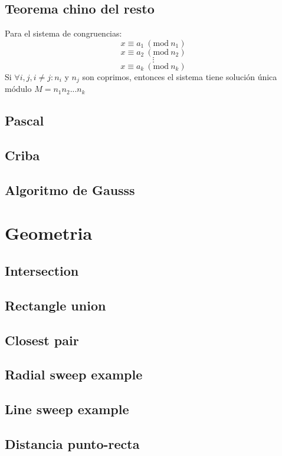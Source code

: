 \documentclass[oneside]{book}
\newcommand{\Mod}[1]{\ (\mathrm{mod}\ #1)}
\begin{document}
	\section{Teorema chino del resto}
	Para el sistema de congruencias:
	\[x\equiv a_1 \Mod {n_1} \]
	\[x\equiv a_2 \Mod {n_2} \]
	\[\vdots\]
	\[x\equiv a_k \Mod {n_k} \]
	Si $\forall i,j, i\neq j: n_i$ y $n_j$ son coprimos, entonces el sistema tiene soluci\'on \'unica m\'odulo $M=n_1n_2...n_k$
	\section{Pascal}
	
	\section{Criba}
	
	\section{Algoritmo de Gausss}
		
	\chapter{Geometria}
	\section{Intersection}
	
	\section{Rectangle union}
	
	\section{Closest pair}
	
	\section{Radial sweep example}
	
	\section{Line sweep example}
	
	\section{Distancia punto-recta}
	
\end{document}
